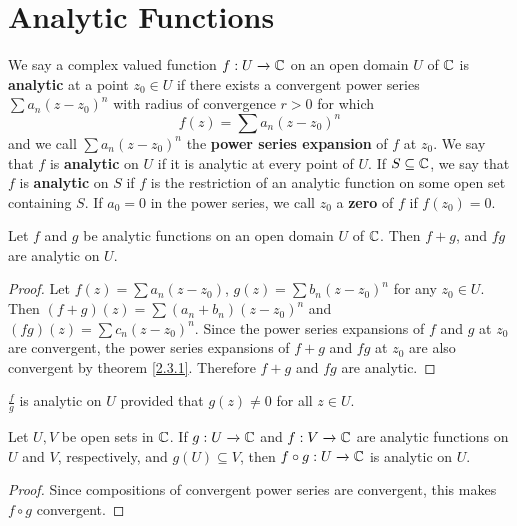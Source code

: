 \section{Analytic Functions}

\begin{definition}
    We say a complex valued function $f:U \xrightarrow{} \mathbb{C}$ on an open domain $U$
    of $\mathbb{C}$ is  \textbf{analytic} at a point $z_0 \in U$ if there exists a
    convergent power series $\sum{a_n(z-z_0)^n}$ with radius of convergence
    $r>0$ for which
    \begin{equation*}
        f(z)=\sum{a_n(z-z_0)^n}
    \end{equation*}
    and we call $\sum{a_n(z-z_0)^n}$ the \textbf{power series expansion} of $f$
    at $z_0$. We say that $f$ is  \textbf{analytic} on $U$ if it is analytic at
    every point of $U$. If $S \subseteq \mathbb{C}$, we say that $f$ is \textbf{analytic} on
    $S$ if $f$ is the restriction of an analytic function on some open set
    containing $S$. If $a_0=0$ in the power series, we call $z_0$ a
    \textbf{zero} of $f$ if  $f(z_0)=0$.
\end{definition}

\begin{theorem}\label{2.4.1}
    Let $f$ and  $g$ be analytic functions on an open domain $U$ of $\mathbb{C}$. Then
    $f+g$, and $fg$ are analytic on  $U$.
\end{theorem}
\begin{proof}
    Let $f(z)=\sum{a_n(z-z_0)}$, $g(z)=\sum{b_n(z-z_0)^n}$ for any $z_0 \in U$.
    Then $(f+g)(z)=\sum{(a_n+b_n)(z-z_0)^n}$ and $(fg)(z)=\sum{c_n(z-z_0)^n}$.
    Since the power series expansions of $f$ and  $g$ at  $z_0$ are convergent,
    the power series expansions of $f+g$ and  $fg$ at  $z_0$ are also convergent
    by theorem \ref{2.3.1}. Therefore $f+g$ and  $fg$ are analytic.
\end{proof}
\begin{corollary}
    $\frac{f}{g}$ is analytic on $U$ provided that $g(z) \neq 0$ for all $z \in
    U$.
\end{corollary}

\begin{theorem}\label{2.4.2}
    Let $U,V$ be open sets in $\mathbb{C}$. If $g:U \xrightarrow{} \mathbb{C}$ and $f:V
    \xrightarrow{} \mathbb{C}$ are analytic functions on $U$ and  $V$, respectively, and
     $g(U) \subseteq V$, then $f \circ g:U \xrightarrow{} \mathbb{C}$ is analytic on
     $U$.
\end{theorem}
\begin{proof}
    Since compositions of convergent power series are convergent, this makes $f
    \circ g$ convergent.
\end{proof}

